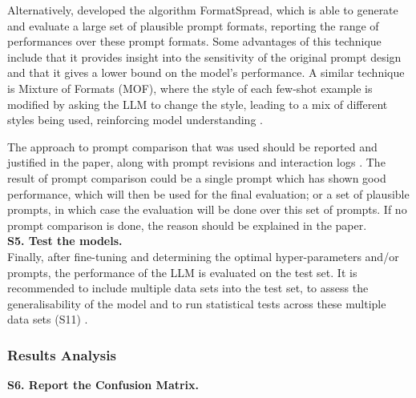 \documentclass[a4paper]{article}
\begin{document}
Alternatively, \textcite{sclar2024quantifyinglanguagemodelssensitivity} developed the algorithm FormatSpread, which is able to generate and evaluate a large set of plausible prompt formats, reporting the range of performances over these prompt formats. Some advantages of this technique include that it provides insight into the sensitivity of the original prompt design and that it gives a lower bound on the model's performance. A similar technique is Mixture of Formats (MOF), where the style of each few-shot example is modified by asking the LLM to change the style, leading to a mix of different styles being used, reinforcing model understanding \cite{ngweta2025MOFrobustness}.

The approach to prompt comparison that was used should be reported and justified in the paper, along with prompt revisions and interaction logs \cite{baltes2025guidelinesempiricalstudiessoftware}. The result of prompt comparison could be a single prompt which has shown good performance, which will then be used for the final evaluation; or a set of plausible prompts, in which case the evaluation will be done over this set of prompts. If no prompt comparison is done, the reason should be explained in the paper.\\

\vspace{1cm}
\textbf{S5. Test the models.}\\
Finally, after fine-tuning and determining the optimal hyper-parameters and/or prompts, the performance of the LLM is evaluated on the test set. It is recommended to include multiple data sets into the test set, to assess the generalisability of the model and to run statistical tests across these multiple data sets (S11) \cite{Dellanna2022}. \\

\subsubsection{Results Analysis}
 
\textbf{S6. Report the Confusion Matrix.}
\end{document}
